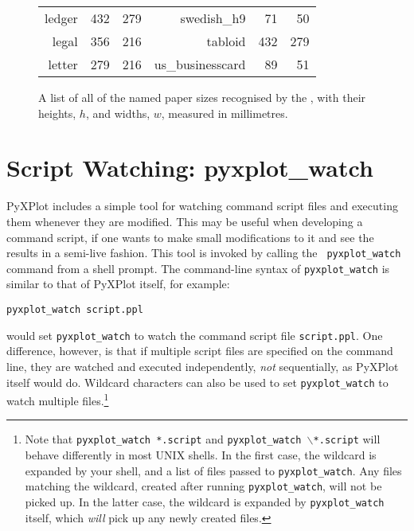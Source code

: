 \begin{figure}
\begin{tabular}{|rrr|rrr|}
                    ledger &    432 &    279 &       swedish\_h9 &     71 &     50 \\
                     legal &    356 &    216 &          tabloid &    432 &    279 \\
                    letter &    279 &    216 &  us\_businesscard &     89 &     51 \\
\hline
\end{tabular}
\caption[A list of all of the named paper sizes recognised by the {\tt set
papersize} command]
{A list of all of the named paper sizes recognised by the , with their heights, $h$, and widths, $w$, measured in millimetres.}
\label{paper_sizes}
\end{figure}

\section{Script Watching: pyxplot\_watch}

PyXPlot includes a simple tool for watching command script files and executing
them whenever they are modified. This may be useful when developing a command
script, if one wants to make small modifications to it and see the results in a
semi-live fashion. This tool is invoked by calling the {\tt
pyxplot\_watch} command from a
shell prompt. The command-line syntax of {\tt pyxplot\_watch} is similar to
that of PyXPlot itself, for example:

\begin{verbatim}
pyxplot_watch script.ppl
\end{verbatim}

\noindent would set {\tt pyxplot\_watch} to watch the command script file
{\tt script.ppl}. One difference, however, is that if multiple script files are
specified on the command line, they are watched and executed independently,
\textit{not} sequentially, as PyXPlot itself would do. Wildcard characters can
also be used to set {\tt pyxplot\_watch} to watch multiple
files.\footnote{Note that {\tt pyxplot\_watch *.script} and
{\tt pyxplot\_watch $\backslash$*.script} will behave differently in most
UNIX shells.  In the first case, the wildcard is expanded by your shell, and a
list of files passed to {\tt pyxplot\_watch}. Any files matching the
wildcard, created after running {\tt pyxplot\_watch}, will not be picked up.
In the latter case, the wildcard is expanded by {\tt pyxplot\_watch} itself,
which {\it will} pick up any newly created files.}

